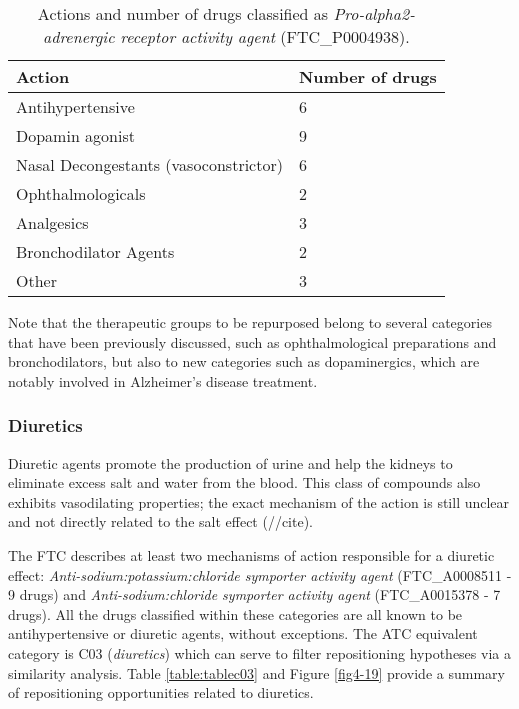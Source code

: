 \begin{table}[htbp]
\small
\begin{tabular}{|p{5cm}|p{5cm}|}
\hline
\textbf{Action} & \textbf{Number of drugs} \\ \hline
Antihypertensive  & 6 \\ \hline
Dopamin agonist & 9 \\ \hline
Nasal Decongestants (vasoconstrictor) & 6 \\ \hline
Ophthalmologicals & 2 \\ \hline
Analgesics & 3 \\ \hline
Bronchodilator Agents & 2 \\ \hline
Other & 3 \\ \hline
\end{tabular}
\caption{Actions and number of drugs classified as \emph{Pro-alpha2-adrenergic receptor activity agent} (FTC\_P0004938).}
\label{table:tablealpha}
\end{table}

Note that the therapeutic groups to be repurposed belong to several categories that have been previously discussed, such as ophthalmological preparations and bronchodilators, but also to new categories such as dopaminergics, which are notably involved in Alzheimer's disease treatment.

\subsubsection{Diuretics}
Diuretic agents promote the production of urine and help the kidneys to eliminate excess salt and water from the blood. This class of compounds also exhibits vasodilating properties; the exact mechanism of the action is still unclear and not directly related to the salt effect (//cite).

The FTC describes at least two mechanisms of action responsible for a diuretic effect: \emph{Anti-sodium:potassium:chloride symporter activity agent} (FTC\_A0008511 - 9 drugs) and \emph{Anti-sodium:chloride symporter activity agent} (FTC\_A0015378 - 7 drugs). All the drugs classified within these categories are all known to be antihypertensive or diuretic agents, without exceptions. The ATC equivalent category is C03 (\emph{diuretics}) which can serve to filter repositioning hypotheses via a similarity analysis. Table \ref{table:tablec03} and Figure \ref{fig4-19} provide a summary of repositioning opportunities related to diuretics.

